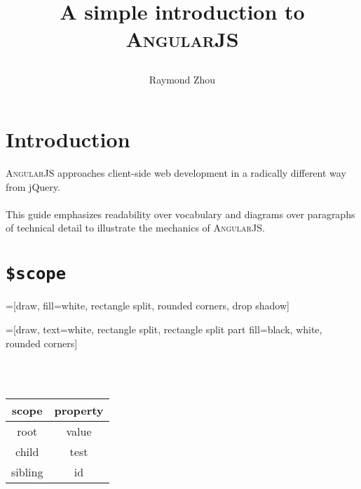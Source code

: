 \documentclass[12pt]{article}
\title{A simple introduction to \textsc{AngularJS}\date{}}
\author{Raymond Zhou}
\begin{document}
\fancyhf{}
\fancyfoot[C]{\thepage}
\renewcommand{\footrulewidth}{0.4pt}  %

\maketitle{}

\section{Introduction}

\textsc{AngularJS} approaches client-side web development in a radically different way from jQuery.
\\\\
This guide emphasizes readability over vocabulary and diagrams over paragraphs of technical detail to illustrate the mechanics of \textsc{AngularJS}.

\section{\texttt{\$scope}}


=[draw, fill=white, rectangle split, rounded corners, drop shadow]


=[draw, text=white, rectangle split, rectangle split part fill={black, white}, rounded corners]
\\\\
\begin{tabular}{cc}
  \toprule
    \textbf{scope} & \textbf{property}\tabularnewline
  \midrule
    root           & value \tabularnewline
    child          & test  \tabularnewline
    sibling        & id    \tabularnewline
  \bottomrule
\end{tabular}
\end{document}
